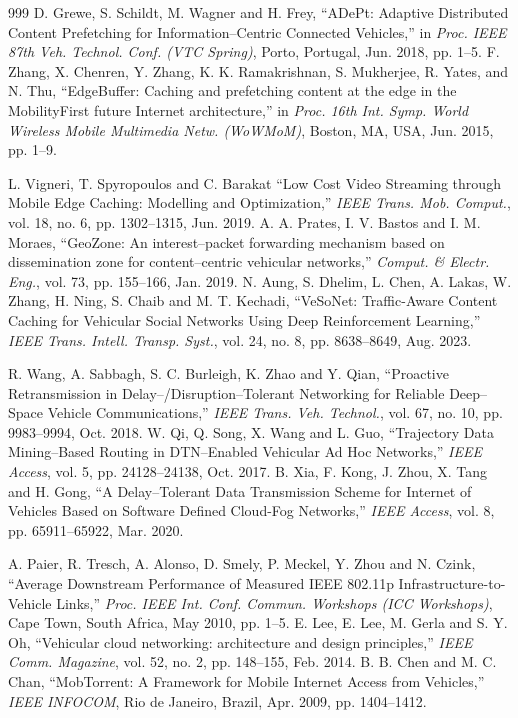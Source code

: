 \documentclass[journal]{IEEEtran}
\begin{document}
\begin{thebibliography}{999}
 D. Grewe, S. Schildt, M. Wagner and H. Frey, ``ADePt: Adaptive Distributed Content Prefetching for Information--Centric Connected Vehicles,'' in \emph{Proc. IEEE 87th Veh. Technol. Conf. (VTC Spring)}, Porto, Portugal, Jun. 2018, pp. 1--5.
 F. Zhang, X. Chenren, Y. Zhang, K. K. Ramakrishnan, S. Mukherjee, R. Yates, and N. Thu, ``EdgeBuffer: Caching and prefetching content at the edge in the MobilityFirst future Internet architecture,'' in \emph{Proc. 16th Int. Symp. World Wireless Mobile Multimedia Netw. (WoWMoM)}, Boston, MA, USA, Jun. 2015, pp. 1--9.

 L. Vigneri, T. Spyropoulos and C. Barakat ``Low Cost Video Streaming through Mobile Edge Caching: Modelling and Optimization,'' \emph{IEEE Trans. Mob. Comput.}, vol. 18, no. 6, pp. 1302--1315, Jun. 2019.
 A. A. Prates, I. V. Bastos and I. M. Moraes, ``GeoZone: An interest--packet forwarding mechanism based on dissemination zone for content--centric vehicular networks,'' \emph{Comput. \& Electr. Eng.}, vol. 73, pp. 155--166, Jan. 2019.
 N. Aung, S. Dhelim, L. Chen, A. Lakas, W. Zhang, H. Ning, S. Chaib and M. T. Kechadi, ``VeSoNet: Traffic-Aware Content Caching for Vehicular Social Networks Using Deep Reinforcement Learning,'' \emph{IEEE Trans. Intell. Transp. Syst.}, vol. 24, no. 8, pp. 8638--8649, Aug. 2023.

 R. Wang, A. Sabbagh, S. C. Burleigh, K. Zhao and Y. Qian, ``Proactive Retransmission in Delay--/Disruption--Tolerant Networking for Reliable Deep--Space Vehicle Communications,'' \emph{IEEE Trans. Veh. Technol.}, vol. 67, no. 10, pp. 9983--9994, Oct. 2018.
 W. Qi, Q. Song, X. Wang and L. Guo, ``Trajectory Data Mining--Based Routing in DTN--Enabled Vehicular Ad Hoc Networks,'' \emph{IEEE Access}, vol. 5, pp. 24128--24138, Oct. 2017.
 B. Xia, F. Kong, J. Zhou, X. Tang and H. Gong, ``A Delay--Tolerant Data Transmission Scheme for Internet of Vehicles Based on Software Defined Cloud-Fog Networks,'' \emph{IEEE Access}, vol. 8, pp. 65911--65922, Mar. 2020.

 A. Paier, R. Tresch, A. Alonso, D. Smely, P. Meckel, Y. Zhou and N. Czink, ``Average Downstream Performance of Measured IEEE 802.11p Infrastructure-to-Vehicle Links,'' \emph{Proc. IEEE Int. Conf. Commun. Workshops (ICC Workshops)}, Cape Town, South Africa, May 2010, pp. 1--5.
 E. Lee, E. Lee, M. Gerla and S. Y. Oh,  ``Vehicular cloud networking: architecture and design principles,'' \emph{IEEE Comm. Magazine}, vol. 52, no. 2, pp. 148--155, Feb. 2014.
 B. B. Chen and M. C. Chan,  ``MobTorrent: A Framework for Mobile Internet Access from Vehicles,'' \emph{IEEE INFOCOM}, Rio de Janeiro, Brazil, Apr. 2009, pp. 1404--1412.


\end{thebibliography}
\end{document}
